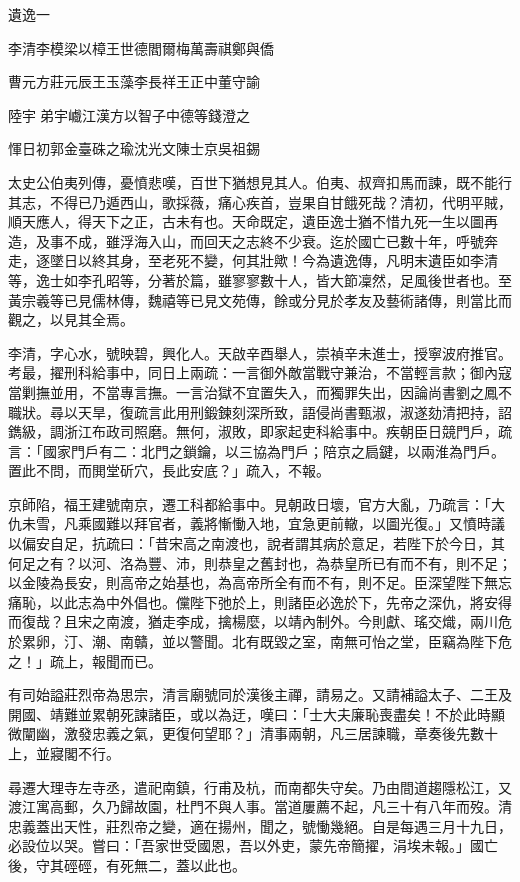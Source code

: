 
\begin{pinyinscope}
遺逸一

李清李模梁以樟王世德閻爾梅萬壽祺鄭與僑

曹元方莊元辰王玉藻李長祥王正中董守諭

陸宇弟宇巇江漢方以智子中德等錢澄之

惲日初郭金臺硃之瑜沈光文陳士京吳祖錫

太史公伯夷列傳，憂憤悲嘆，百世下猶想見其人。伯夷、叔齊扣馬而諫，既不能行其志，不得已乃遁西山，歌採薇，痛心疾首，豈果自甘餓死哉？清初，代明平賊，順天應人，得天下之正，古未有也。天命既定，遺臣逸士猶不惜九死一生以圖再造，及事不成，雖浮海入山，而回天之志終不少衰。迄於國亡已數十年，呼號奔走，逐墜日以終其身，至老死不變，何其壯歟！今為遺逸傳，凡明末遺臣如李清等，逸士如李孔昭等，分著於篇，雖寥寥數十人，皆大節凜然，足風後世者也。至黃宗羲等已見儒林傳，魏禧等已見文苑傳，餘或分見於孝友及藝術諸傳，則當比而觀之，以見其全焉。

李清，字心水，號映碧，興化人。天啟辛酉舉人，崇禎辛未進士，授寧波府推官。考最，擢刑科給事中，同日上兩疏：一言御外敵當戰守兼治，不當輕言款；御內寇當剿撫並用，不當專言撫。一言治獄不宜置失入，而獨罪失出，因論尚書劉之鳳不職狀。尋以天旱，復疏言此用刑鍛鍊刻深所致，語侵尚書甄淑，淑遂劾清把持，詔鐫級，調浙江布政司照磨。無何，淑敗，即家起吏科給事中。疾朝臣日競門戶，疏言：「國家門戶有二：北門之鎖鑰，以三協為門戶；陪京之扃鍵，以兩淮為門戶。置此不問，而閧堂斫穴，長此安底？」疏入，不報。

京師陷，福王建號南京，遷工科都給事中。見朝政日壞，官方大亂，乃疏言：「大仇未雪，凡乘國難以拜官者，義將慚慟入地，宜急更前轍，以圖光復。」又憤時議以偏安自足，抗疏曰：「昔宋高之南渡也，說者謂其病於意足，若陛下於今日，其何足之有？以河、洛為豐、沛，則恭皇之舊封也，為恭皇所已有而不有，則不足；以金陵為長安，則高帝之始基也，為高帝所全有而不有，則不足。臣深望陛下無忘痛恥，以此志為中外倡也。儻陛下弛於上，則諸臣必逸於下，先帝之深仇，將安得而復哉？且宋之南渡，猶走李成，擒楊麼，以靖內制外。今則獻、瑤交熾，兩川危於累卵，汀、潮、南贛，並以警聞。北有既毀之室，南無可怡之堂，臣竊為陛下危之！」疏上，報聞而已。

有司始謚莊烈帝為思宗，清言廟號同於漢後主禪，請易之。又請補謚太子、二王及開國、靖難並累朝死諫諸臣，或以為迂，嘆曰：「士大夫廉恥喪盡矣！不於此時顯微闡幽，激發忠義之氣，更復何望耶？」清事兩朝，凡三居諫職，章奏後先數十上，並寢閣不行。

尋遷大理寺左寺丞，遣祀南鎮，行甫及杭，而南都失守矣。乃由間道趨隱松江，又渡江寓高郵，久乃歸故園，杜門不與人事。當道屢薦不起，凡三十有八年而歿。清忠義蓋出天性，莊烈帝之變，適在揚州，聞之，號慟幾絕。自是每遇三月十九日，必設位以哭。嘗曰：「吾家世受國恩，吾以外吏，蒙先帝簡擢，涓埃未報。」國亡後，守其硜硜，有死無二，蓋以此也。


\end{pinyinscope}
